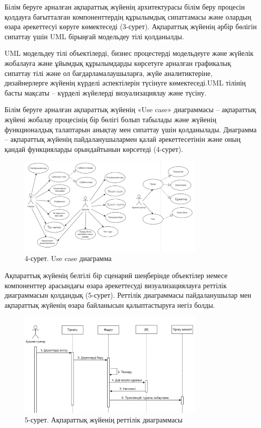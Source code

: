 Білім беруге арналған ақпараттық жүйенің архитектурасы білім беру
процесін қолдауға бағытталған компоненттердің құрылымдық сипаттамасы
және олардың өзара әрекеттесуі көруге көмектеседі (3-сурет). Ақпараттық
жүйенің әрбір бөлігін сипаттау үшін UML бірыңғай модельдеу тілі
қолданылды.

UML модельдеу тілі объектілерді, бизнес процестерді модельдеуге және
жүйелік жобалауға және ұйымдық құрылымдарды көрсетуге арналған
графикалық сипаттау тілі және ол бағдарламалаушыларға, жүйе
аналитиктеріне, дизайнерлерге жүйенің күрделі аспектілерін түсінуге
көмектеседі.UML тілінің басты мақсаты -- күрделі жүйелерді
визуализациялау және түсіну.

Білім беруге арналған ақпараттық жүйенің «Use case» диаграммасы --
ақпараттық жүйені жобалау процесінің бір бөлігі болып табылады және
жүйенің функционалдық талаптарын анықтау мен сипаттау үшін қолданылады.
Диаграмма -- ақпараттық жүйенің пайдаланушылармен қалай әрекеттесетінін
және оның қандай функцияларды орындайтынын көрсетеді (4-сурет).

\begin{figure}[H]
	\centering
	\includegraphics[width=0.8\textwidth]{media/ict/image102}
	\caption*{4-сурет. Use case диаграмма}
\end{figure}

Ақпараттық жүйенің белгілі бір сценарий шеңберінде объектілер немесе
компоненттер арасындағы өзара әрекеттесуді визуализациялауға реттілік
диаграммасын қолдандық (5-сурет). Реттілік диаграммасы пайдаланушылар
мен ақпараттық жүйенің өзара байланысын қалыптастыруға негіз болды.

\begin{figure}[H]
	\centering
	\includegraphics[width=0.8\textwidth]{media/ict/image103}
	\caption*{5-сурет. Ақпараттық жүйенің реттілік диаграммасы}
\end{figure}

